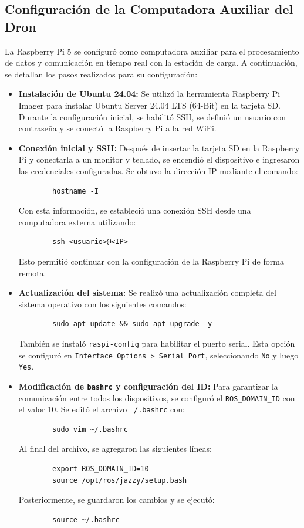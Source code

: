 \subsection{Configuración de la Computadora Auxiliar del Dron} 
    La Raspberry Pi 5 se configuró como computadora auxiliar para el procesamiento de datos y comunicación en tiempo real con la estación de carga. A continuación, se detallan los pasos realizados para su configuración:
    
    \begin{itemize}
        \item \textbf{Instalación de Ubuntu 24.04:} 
        Se utilizó la herramienta Raspberry Pi Imager para instalar Ubuntu Server 24.04 LTS (64-Bit) en la tarjeta SD. Durante la configuración inicial, se habilitó SSH, se definió un usuario con contraseña y se conectó la Raspberry Pi a la red WiFi.
    
        \item \textbf{Conexión inicial y SSH:} 
        Después de insertar la tarjeta SD en la Raspberry Pi y conectarla a un monitor y teclado, se encendió el dispositivo e ingresaron las credenciales configuradas. Se obtuvo la dirección IP mediante el comando:
        \begin{verbatim}
        hostname -I
        \end{verbatim}
        Con esta información, se estableció una conexión SSH desde una computadora externa utilizando:
        \begin{verbatim}
        ssh <usuario>@<IP>
        \end{verbatim}
        Esto permitió continuar con la configuración de la Raspberry Pi de forma remota.
    
        \item \textbf{Actualización del sistema:} 
        Se realizó una actualización completa del sistema operativo con los siguientes comandos:
        \begin{verbatim}
        sudo apt update && sudo apt upgrade -y
        \end{verbatim}
        También se instaló \texttt{raspi-config} para habilitar el puerto serial. Esta opción se configuró en \texttt{Interface Options > Serial Port}, seleccionando \texttt{No} y luego \texttt{Yes}.
    
        \item \textbf{Modificación de \texttt{bashrc} y configuración del ID:} 
        Para garantizar la comunicación entre todos los dispositivos, se configuró el \texttt{ROS\_DOMAIN\_ID} con el valor 10. Se editó el archivo \texttt{~/.bashrc} con:
        \begin{verbatim}
        sudo vim ~/.bashrc
        \end{verbatim}
        Al final del archivo, se agregaron las siguientes líneas:
        \begin{verbatim}
        export ROS_DOMAIN_ID=10
        source /opt/ros/jazzy/setup.bash
        \end{verbatim}
        Posteriormente, se guardaron los cambios y se ejecutó:
        \begin{verbatim}
        source ~/.bashrc
        \end{verbatim}
    

\end{itemize}
